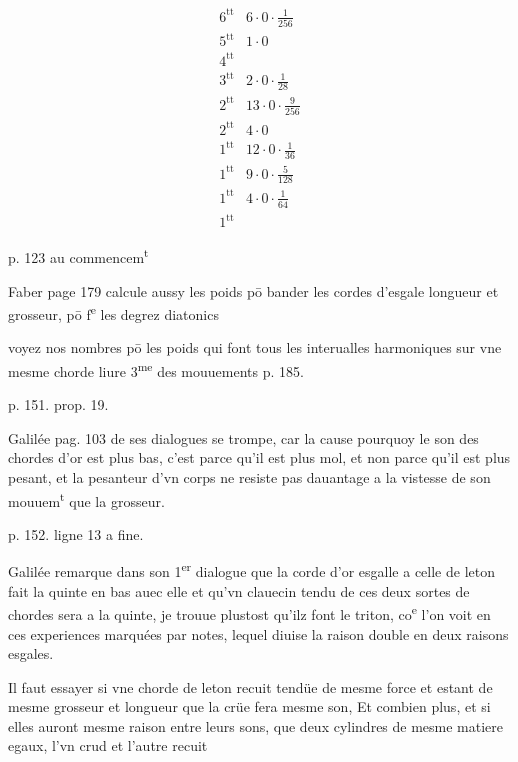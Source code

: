 \documentclass[11pt,a4paper]{article}
\begin{document}
\[
\begin{array}{ll}
6^{\text{tt}} & 6\cdot 0\cdot \frac{1}{256} \\
5^{\text{tt}} & 1\cdot 0 \\
4^{\text{tt}} & \\
3^{\text{tt}} & 2\cdot 0\cdot \frac{1}{28} \\
2^{\text{tt}} & 13\cdot 0\cdot \frac{9}{256} \\
2^{\text{tt}} & 4\cdot 0 \\
1^{\text{tt}} & 12\cdot 0\cdot \frac{1}{36} \\
1^{\text{tt}} & 9\cdot 0\cdot \frac{5}{128} \\
1^{\text{tt}} & 4\cdot 0\cdot \frac{1}{64} \\
1^{\text{tt}} &
\end{array}
\]

p. 123 au commencem\textsuperscript{t}

Faber page 179 calcule aussy les poids pō bander les cordes d'esgale longueur et grosseur, pō f\textsuperscript{e} les degrez diatonics

voyez nos nombres pō les poids qui font tous les interualles harmoniques sur vne mesme chorde liure 3\textsuperscript{me} des mouuements p. 185.

p. 151. prop. 19.

Galilée pag. 103 de ses dialogues se trompe, car la cause pourquoy le son des chordes d'or est plus bas, c'est parce qu'il est plus mol, et non parce qu'il est plus pesant, et la pesanteur d'vn corps ne resiste pas dauantage a la vistesse de son mouuem\textsuperscript{t} que la grosseur.

p. 152. ligne 13 a fine.

Galilée remarque dans son 1\textsuperscript{er} dialogue que la corde d'or esgalle a celle de leton fait la quinte en bas auec elle et qu'vn clauecin tendu de ces deux sortes de chordes sera a la quinte, je trouue plustost qu'ilz font le triton, co\textsuperscript{e} l'on voit en ces experiences marquées par notes, lequel diuise la raison double en deux raisons esgales.

Il faut essayer si vne chorde de leton recuit tendüe de mesme force et estant de mesme grosseur et longueur que la crüe fera mesme son, Et combien plus, et si elles auront mesme raison entre leurs sons, que deux cylindres de mesme matiere egaux, l'vn crud et l'autre recuit
\end{document}
